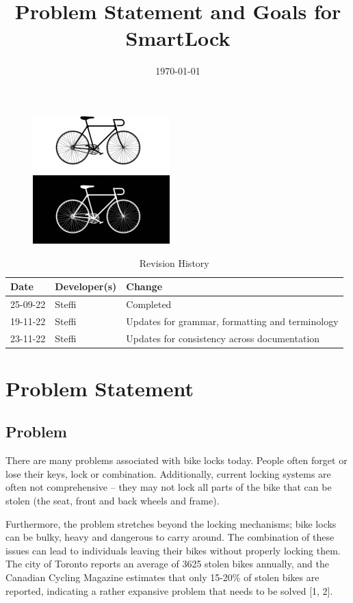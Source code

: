 \documentclass{article}
\title{Problem Statement and Goals for SmartLock\\\progname}
\author{\authname}
\date{\today}
\begin{document}
\maketitle
\thispagestyle{empty}
\begin{figure}[h!]
  \centering
  \includegraphics[width=0.4\linewidth]{../BikeLogo.jpg}
\end{figure}

\newpage
{}
\begin{table}[hp]
\caption{Revision History} \label{TblRevisionHistory}
\begin{tabularx}{\textwidth}{llX}
\toprule
\textbf{Date} & \textbf{Developer(s)} & \textbf{Change}\\
\midrule
25-09-22 & Steffi & Completed\\
19-11-22 & Steffi & Updates for grammar, formatting and terminology\\
23-11-22 & Steffi & Updates for consistency across documentation\\
\bottomrule
\end{tabularx}
\end{table}

\newpage
\tableofcontents

\newpage
{}
\section{Problem Statement}

\subsection{Problem}

There are many problems associated with bike locks today.  People often forget or lose their keys, lock or combination.  Additionally, current locking systems are often not comprehensive – they may not lock all parts of the bike that can be stolen (the seat, front and back wheels and frame). 

Furthermore, the problem stretches beyond the locking mechanisms; bike locks can be bulky, heavy and dangerous to carry around.  The combination of these issues can lead to individuals leaving their bikes without properly locking them.  The city of Toronto reports an average of 3625 stolen bikes annually, and the Canadian Cycling Magazine estimates that only 15-20\% of stolen bikes are reported, indicating a rather expansive problem that needs to be solved [1, 2]. 
\end{document}
